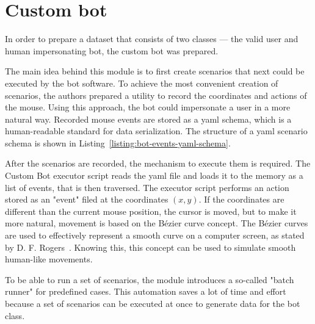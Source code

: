 \section{Custom bot}\label{sec:custom-bot}
In order to prepare a dataset that consists of two classes --- the valid user and human impersonating bot, the custom bot was prepared.

The main idea behind this module is to first create scenarios that next could be executed by the bot software.
To achieve the most convenient creation of scenarios, the authors prepared a utility to record the coordinates and actions of the mouse.
Using this approach, the bot could impersonate a user in a more natural way.
Recorded mouse events are stored as a \gls{yaml} schema, which is a human-readable standard for data serialization.
The structure of a \gls{yaml} scenario schema is shown in Listing~\ref{listing:bot-events-yaml-schema}.



After the scenarios are recorded, the mechanism to execute them is required.
The Custom Bot executor script reads the \gls{yaml} file and loads it to the memory as a list of events, that is then traversed.
The executor script performs an action stored as an "event" filed at the coordinates $(x, y)$.
If the coordinates are different than the current mouse position, the cursor is moved, but to make it more natural, movement is based on the Bézier curve concept.
The Bézier curves are used to effectively represent a smooth curve on a computer screen, as stated by D. F. Rogers~\cite{bezier-curves}.
Knowing this, this concept can be used to simulate smooth human-like movements.

To be able to run a set of scenarios, the module introduces a so-called "batch runner" for predefined cases.
This automation saves a lot of time and effort because a set of scenarios can be executed at once to generate data for the bot class.


